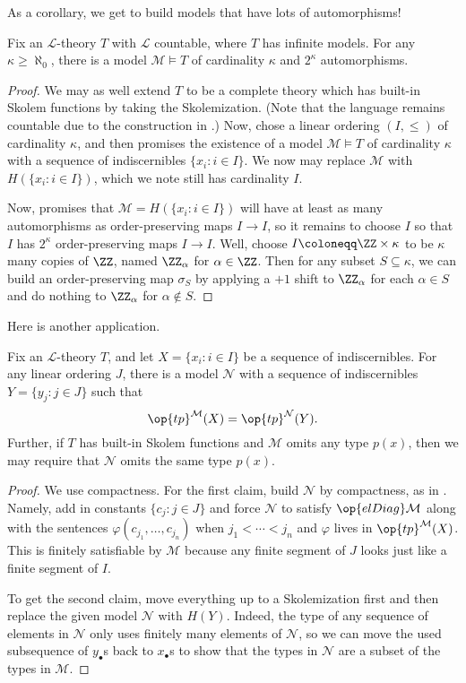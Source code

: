 \documentclass[../notes.tex]{subfiles}
\begin{document}
As a corollary, we get to build models that have lots of automorphisms!
\begin{corollary}
	Fix an $\mathcal L$-theory $T$ with $\mathcal L$ countable, where $T$ has infinite models. For any $\kappa\ge\aleph_0$, there is a model $\mathcal M\models T$ of cardinality $\kappa$ and $2^\kappa$ automorphisms.
\end{corollary}
\begin{proof}
	We may as well extend $T$ to be a complete theory which has built-in Skolem functions by taking the Skolemization. (Note that the language remains countable due to the construction in .) Now, chose a linear ordering $(I,\le)$ of cardinality $\kappa$, and then  promises the existence of a model $\mathcal M\models T$ of cardinality $\kappa$ with a sequence of indiscernibles $\{x_i:i\in I\}$. We now may replace $\mathcal M$ with $H(\{x_i:i\in I\})$, which we note still has cardinality $I$.

	Now,  promises that $\mathcal M=H(\{x_i:i\in I\})$ will have at least as many automorphisms as order-preserving maps $I\to I$, so it remains to choose $I$ so that $I$ has $2^\kappa$ order-preserving maps $I\to I$. Well, choose $I\coloneqq\ZZ\times\kappa$ to be $\kappa$ many copies of $\ZZ$, named $\ZZ_\alpha$ for $\alpha\in\ZZ$. Then for any subset $S\subseteq\kappa$, we can build an order-preserving map $\sigma_S$ by applying a $+1$ shift to $\ZZ_\alpha$ for each $\alpha\in S$ and do nothing to $\ZZ_\alpha$ for $\alpha\notin S$.
\end{proof}
Here is another application.
\begin{lemma}
	Fix an $\mathcal L$-theory $T$, and let $X=\{x_i:i\in I\}$ be a sequence of indiscernibles. For any linear ordering $J$, there is a model $\mathcal N$ with a sequence of indiscernibles $Y=\{y_j:j\in J\}$ such that
	\[\op{tp}^\mathcal M(X)=\op{tp}^\mathcal N(Y).\]
	Further, if $T$ has built-in Skolem functions and $\mathcal M$ omits any type $p(x)$, then we may require that $\mathcal N$ omits the same type $p(x)$.
\end{lemma}
\begin{proof}
	We use compactness. For the first claim, build $\mathcal N$ by compactness, as in . Namely, add in constants $\{c_j:j\in J\}$ and force $\mathcal N$ to satisfy $\op{elDiag}\mathcal M$ along with the sentences $\varphi(c_{j_1},\ldots,c_{j_n})$ when $j_1<\cdots<j_n$ and $\varphi$ lives in $\op{tp}^\mathcal M(X)$. This is finitely satisfiable by $\mathcal M$ because any finite segment of $J$ looks just like a finite segment of $I$.

	To get the second claim, move everything up to a Skolemization first and then replace the given model $\mathcal N$ with $H(Y)$. Indeed, the type of any sequence of elements in $\mathcal N$ only uses finitely many elements of $\mathcal N$, so we can move the used subsequence of $y_\bullet$s back to $x_\bullet$s to show that the types in $\mathcal N$ are a subset of the types in $\mathcal M$.
\end{proof}
\end{document}

